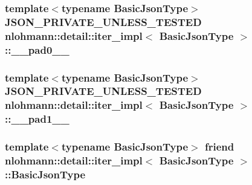 \subsubsection[{\texorpdfstring{\+\_\+\+\_\+pad0\+\_\+\+\_\+}{__pad0__}}]{\setlength{\rightskip}{0pt plus 5cm}template$<$typename Basic\+Json\+Type$>$ {\bf J\+S\+O\+N\+\_\+\+P\+R\+I\+V\+A\+T\+E\+\_\+\+U\+N\+L\+E\+S\+S\+\_\+\+T\+E\+S\+T\+ED} {\bf nlohmann\+::detail\+::iter\+\_\+impl}$<$ {\bf Basic\+Json\+Type} $>$\+::\+\_\+\+\_\+pad0\+\_\+\+\_\+}\hypertarget{classnlohmann_1_1detail_1_1iter__impl_aa4bddeaa9a97b2a9b715918a7e8dcc3a}{}\label{classnlohmann_1_1detail_1_1iter__impl_aa4bddeaa9a97b2a9b715918a7e8dcc3a}
\subsubsection[{\texorpdfstring{\+\_\+\+\_\+pad1\+\_\+\+\_\+}{__pad1__}}]{\setlength{\rightskip}{0pt plus 5cm}template$<$typename Basic\+Json\+Type$>$ {\bf J\+S\+O\+N\+\_\+\+P\+R\+I\+V\+A\+T\+E\+\_\+\+U\+N\+L\+E\+S\+S\+\_\+\+T\+E\+S\+T\+ED} {\bf nlohmann\+::detail\+::iter\+\_\+impl}$<$ {\bf Basic\+Json\+Type} $>$\+::\+\_\+\+\_\+pad1\+\_\+\+\_\+}\hypertarget{classnlohmann_1_1detail_1_1iter__impl_a4a60e9d074cc53929b73eaa7963f1fa9}{}\label{classnlohmann_1_1detail_1_1iter__impl_a4a60e9d074cc53929b73eaa7963f1fa9}
\subsubsection[{\texorpdfstring{Basic\+Json\+Type}{BasicJsonType}}]{\setlength{\rightskip}{0pt plus 5cm}template$<$typename Basic\+Json\+Type$>$ friend {\bf nlohmann\+::detail\+::iter\+\_\+impl}$<$ Basic\+Json\+Type $>$\+::Basic\+Json\+Type\hspace{0.3cm}{\ttfamily [private]}}\hypertarget{classnlohmann_1_1detail_1_1iter__impl_abf18f18793f84b0222aebb5a2a87da7a}{}\label{classnlohmann_1_1detail_1_1iter__impl_abf18f18793f84b0222aebb5a2a87da7a}
